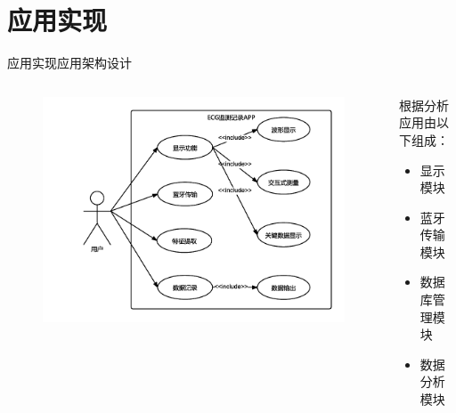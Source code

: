 \documentclass[aspectratio=43,fleqn]{beamer}
\begin{document}
\section{应用实现}
\begin{frame}{应用实现}{应用架构设计}
\begin{columns}
\begin{figure}[ht]
	\includegraphics[width=\textwidth]{fig4.png}
\end{figure}
\begin{block}{根据分析应用由以下组成：}
\begin{itemize}
	\item 显示模块
	\item 蓝牙传输模块 
	\item 数据库管理模块
	\item 数据分析模块
\end{itemize}
\end{block}
\end{columns}
\end{frame}
\end{document}
